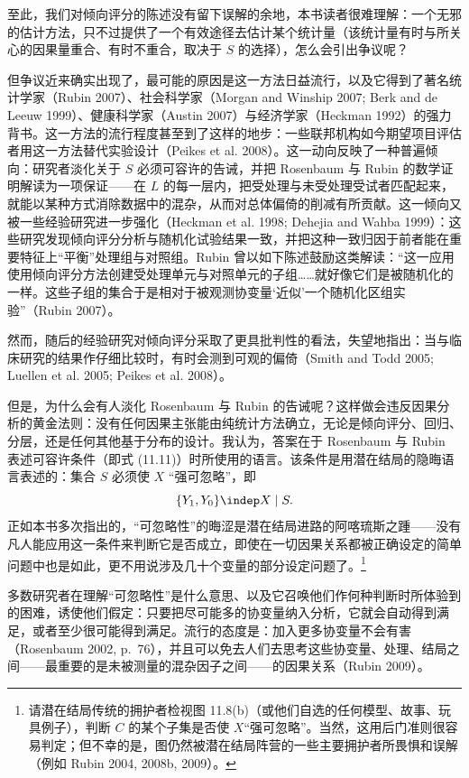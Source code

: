 至此，我们对倾向评分的陈述没有留下误解的余地，本书读者很难理解：一个无邪的估计方法，只不过提供了一个有效途径去估计某个统计量（该统计量有时与所关心的因果量重合、有时不重合，取决于 $S$ 的选择），怎么会引出争议呢？

但争议近来确实出现了，最可能的原因是这一方法日益流行，以及它得到了著名统计学家（Rubin 2007）、社会科学家（Morgan and Winship 2007; Berk and de Leeuw 1999）、健康科学家（Austin 2007）与经济学家（Heckman 1992）的强力背书。这一方法的流行程度甚至到了这样的地步：一些联邦机构如今期望项目评估者用这一方法替代实验设计（Peikes et al. 2008）。这一动向反映了一种普遍倾向：研究者淡化关于 $S$ 必须可容许的告诫，并把 Rosenbaum 与 Rubin 的数学证明解读为一项保证——在 $L$ 的每一层内，把受处理与未受处理受试者匹配起来，就能以某种方式消除数据中的混杂，从而对总体偏倚的削减有所贡献。这一倾向又被一些经验研究进一步强化（Heckman et al. 1998; Dehejia and Wahba 1999）：这些研究发现倾向评分分析与随机化试验结果一致，并把这种一致归因于前者能在重要特征上“平衡”处理组与对照组。Rubin 曾以如下陈述鼓励这类解读：“这一应用使用倾向评分方法创建受处理单元与对照单元的子组……就好像它们是被随机化的一样。这些子组的集合于是相对于被观测协变量‘近似’一个随机化区组实验”（Rubin 2007）。

然而，随后的经验研究对倾向评分采取了更具批判性的看法，失望地指出：当与临床研究的结果作仔细比较时，有时会测到可观的偏倚（Smith and Todd 2005; Luellen et al. 2005; Peikes et al. 2008）。

但是，为什么会有人淡化 Rosenbaum 与 Rubin 的告诫呢？这样做会违反因果分析的黄金法则：没有任何因果主张能由纯统计方法确立，无论是倾向评分、回归、分层，还是任何其他基于分布的设计。我认为，答案在于 Rosenbaum 与 Rubin 表述可容许条件（即式 (11.11)）时所使用的语言。该条件是用潜在结局的隐晦语言表述的：集合 $S$ 必须使 $X$ “强可忽略”，即
\[
\{Y_1,Y_0\}\indep X\mid S.
\]
正如本书多次指出的，“可忽略性”的晦涩是潜在结局进路的阿喀琉斯之踵——没有凡人能应用这一条件来判断它是否成立，即使在一切因果关系都被正确设定的简单问题中也是如此，更不用说涉及几十个变量的部分设定问题了。\footnote{请潜在结局传统的拥护者检视图 11.8(b)（或他们自选的任何模型、故事、玩具例子），判断 $C$ 的某个子集是否使 $X$“强可忽略”。当然，这用后门准则很容易判定；但不幸的是，图仍然被潜在结局阵营的一些主要拥护者所畏惧和误解（例如 Rubin 2004, 2008b, 2009）。}

多数研究者在理解“可忽略性”是什么意思、以及它召唤他们作何种判断时所体验到的困难，诱使他们假定：只要把尽可能多的协变量纳入分析，它就会自动得到满足，或者至少很可能得到满足。流行的态度是：加入更多协变量不会有害（Rosenbaum 2002, p.~76），并且可以免去人们去思考这些协变量、处理、结局之间——最重要的是未被测量的混杂因子之间——的因果关系（Rubin 2009）。

